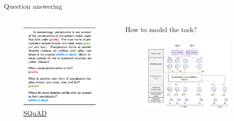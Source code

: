 \documentclass[usenames,dvipsnames,notes,11pt,aspectratio=169,hyperref={colorlinks=true, linkcolor=blue}]{beamer}
\begin{document}
\begin{frame}
    {Question answering}
    \begin{columns}
        \begin{column}{0.5\textwidth}
            \begin{figure}
                \includegraphics[height=0.7\textheight]{figures/squad}
                \caption{\href{https://arxiv.org/pdf/1606.05250.pdf}{SQuAD}}
            \end{figure}
        \end{column}
        \begin{column}{0.5\textwidth}
            How to model the task? \pause
            \begin{figure}
                \includegraphics[height=0.7\textheight]{figures/bidaf}

\end{figure}
\end{column}
\end{columns}
\end{frame}
\end{document}
